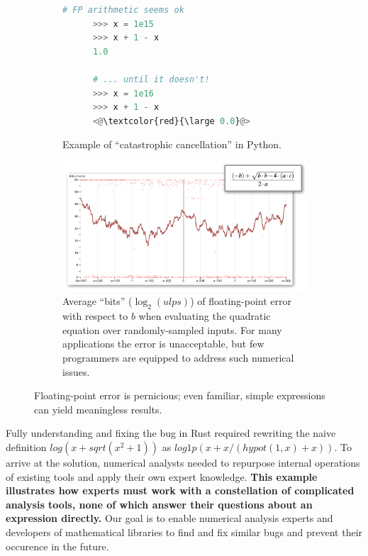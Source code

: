 \begin{figure}
  \centering
  \begin{subfigure}[b]{0.4\textwidth} 
    \begin{lstlisting}[language=Python,commentstyle=\color{blue}] 
      # FP arithmetic seems ok
      >>> x = 1e15
      >>> x + 1 - x
      1.0

      # ... until it doesn't!
      >>> x = 1e16
      >>> x + 1 - x
      <@\textcolor{red}{\large 0.0}@>
    \end{lstlisting}
% 
    \caption{
      Example of ``catastrophic cancellation'' in Python. \\[8pt]
    }
    \label{fig:cancellation}
  \end{subfigure}
  \hfill
  \begin{subfigure}[b]{0.45\textwidth}

    \includegraphics[width=\textwidth]{figures/quadp-error-with-eqn.png}
    \caption{
      Average ``bits'' 
        ($\log_2(\mathit{ulps})$)  
        of floating-point error
        with respect to $b$
        when evaluating the quadratic equation over
        randomly-sampled inputs.
      For many applications the error is unacceptable,
        but few programmers are equipped
        to address such numerical issues.
    }
    \label{fig:quadp-error}
  \end{subfigure}
  \caption{
    Floating-point error is pernicious;
      even familiar, simple expressions
      can yield meaningless results.
  }
\end{figure}

Fully understanding and fixing the bug in Rust required
  rewriting the naive definition $log(x + sqrt(x^2 + 1))$ as
  $log1p(x + x/(hypot(1, x) + x))$.
To arrive at the solution,
  numerical analysts needed to 
  repurpose internal operations of existing tools
  and apply their own expert knowledge.
\textbf{This example illustrates how experts must work with a constellation 
  of complicated analysis tools,
  none of which answer their questions 
  about an expression directly.}
Our goal is to enable numerical analysis experts and 
  developers of mathematical libraries 
  to find and fix similar bugs and prevent their occurence in the future.

